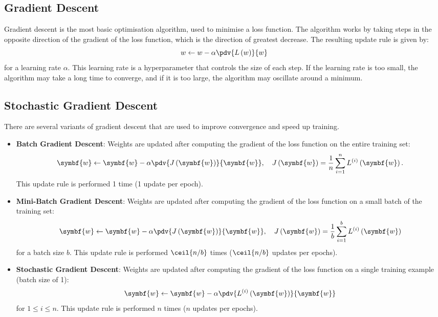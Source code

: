 \documentclass{article}
\begin{document}
\subsection{Gradient Descent}
Gradient descent is the most basic optimisation algorithm, used to
minimise a loss function. The algorithm works by taking steps in the
opposite direction of the gradient of the loss function, which is the
direction of greatest decrease. The resulting update rule is given by:
\begin{equation*}
    w \leftarrow w - \alpha \pdv{L\left( w \right)}{w}
\end{equation*}
for a learning rate \(\alpha\). This learning rate is a hyperparameter
that controls the size of each step. If the learning rate is too small,
the algorithm may take a long time to converge, and if it is too large,
the algorithm may oscillate around a minimum.
\subsection{Stochastic Gradient Descent}
There are several variants of gradient descent that are used to improve
convergence and speed up training.
\begin{itemize}
    \item \textbf{Batch Gradient Descent}: Weights are updated after
          computing the gradient of the loss function on the entire
          training set:
          \begin{equation*}
              \symbf{w} \leftarrow \symbf{w} - \alpha \pdv{J\left( \symbf{w} \right)}{\symbf{w}}, \quad J\left( \symbf{w} \right) = \frac{1}{n} \sum_{i = 1}^n L^{\left( i \right)}\left( \symbf{w} \right).
          \end{equation*}
          This update rule is performed 1 time (1 update per epoch).
    \item \textbf{Mini-Batch Gradient Descent}: Weights are updated after
          computing the gradient of the loss function on a small batch
          of the training set:
          \begin{equation*}
              \symbf{w} \leftarrow \symbf{w} - \alpha \pdv{J\left( \symbf{w} \right)}{\symbf{w}}, \quad J\left( \symbf{w} \right) = \frac{1}{b} \sum_{i = 1}^b L^{\left( i \right)}\left( \symbf{w} \right)
          \end{equation*}
          for a batch size \(b\). This update rule is performed
          \(\ceil{n/b}\) times (\(\ceil{n/b}\) updates per epochs).
    \item \textbf{Stochastic Gradient Descent}: Weights are updated after
          computing the gradient of the loss function on a single
          training example (batch size of 1):
          \begin{equation*}
              \symbf{w} \leftarrow \symbf{w} - \alpha \pdv{L^{\left( i \right)}\left( \symbf{w} \right)}{\symbf{w}}
          \end{equation*}
          for \(1 \leqslant i \leqslant n\). This update rule is
          performed \(n\) times (\(n\) updates per epochs).
\end{itemize}
\end{document}
